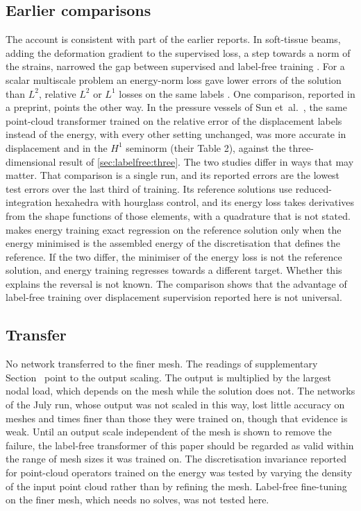 \subsection{Earlier comparisons}\label{sec:discussion:earlier}
The account is consistent with part of the earlier reports. In soft-tissue beams, adding the
deformation gradient to the supervised loss, a step towards a norm of the strains, narrowed
the gap between supervised and label-free training \cite{Dalton2023}. For a scalar multiscale
problem an energy-norm loss gave lower errors of the solution than $L^2$,
relative $L^2$ or $L^1$ losses on the same labels \cite{Haltmayer2026LOD}. One comparison,
reported in a preprint, points the other way. In the pressure vessels of Sun
et~al.~\cite{Sun2026FEVessel}, the same point-cloud transformer trained on the relative
error of the displacement labels instead of the energy, with every other setting unchanged,
was more accurate in displacement and in the $H^1$ seminorm (their Table 2), against the
three-dimensional result of \cref{sec:labelfree:three}. The two studies differ in ways that
may matter. That comparison is a single run, and its reported errors are the lowest test
errors over the last third of training. Its reference solutions use reduced-integration
hexahedra with hourglass control, and its energy loss takes derivatives from the shape
functions of those elements, with a quadrature that is not stated.  makes
energy training exact regression on the reference solution only when the energy minimised is
the assembled energy of the discretisation that defines the reference. If the two differ,
the minimiser of the energy loss is not the reference solution, and energy training
regresses towards a different target. Whether this explains the reversal is not known. The
comparison shows that the advantage of label-free training over displacement supervision
reported here is not universal.

\subsection{Transfer}\label{sec:discussion:transfer}
No network transferred to the finer mesh. The readings of supplementary
Section~\SuppTransfer{} point to the output scaling. The output is multiplied by the largest nodal load, which depends
on the mesh while the solution does not. The networks of the July run, whose output was not scaled in this way, lost little accuracy on meshes
\numCoarsenLow{} and \numCoarsenHigh{} times finer than those they were trained on, though
that evidence is weak. Until an output scale independent of the mesh is shown to remove the
failure, the label-free transformer of this paper should be regarded as valid within the range of mesh sizes it was trained on. The discretisation invariance reported for
point-cloud operators trained on the energy \cite{Wang2026PretrainFEM,Sun2026FEVessel} was
tested by varying the density of the input point cloud rather than by refining the mesh.
Label-free fine-tuning on the finer mesh, which needs no solves, was not tested here.

